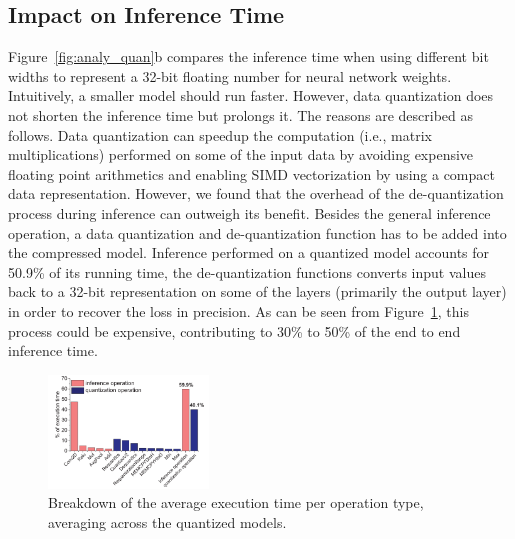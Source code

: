 \subsection{Impact on Inference Time\label{sec:time}}
 Figure~\ref{fig:analy_quan}b compares the inference time when using different bit
widths to represent a 32-bit floating number for neural network weights. Intuitively, a smaller model should run faster. However, data
quantization does not shorten the inference time but prolongs it. The reasons are described as follows. Data quantization can speedup the
computation (i.e., matrix multiplications) performed on some of the input data by avoiding expensive floating point arithmetics and
enabling SIMD vectorization by using a compact data representation. However, we found that the overhead of the de-quantization process
during inference can outweigh its benefit. Besides the general inference operation, a data quantization and de-quantization function has to
be added into the compressed model. Inference performed on a quantized model accounts for 50.9\% of its running time, the de-quantization
functions converts input values back to a 32-bit representation on some of the layers (primarily the output layer) in order to recover the
loss in precision. As can be seen from Figure~\ref{fig:breakdown}, this process could be expensive, contributing to 30\% to 50\% of the end
to end inference time.

\begin{figure}
\begin{center}
\includegraphics[width=0.38\textwidth]{figure/breakdown4.pdf}
\end{center}
\caption{Breakdown of the average execution time per operation type, averaging across the quantized models.}
\vspace{-4mm}
\label{fig:breakdown}
\end{figure}


